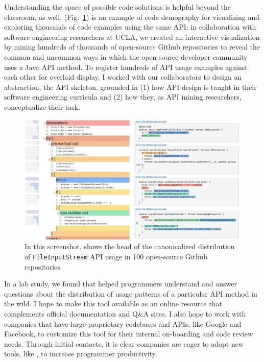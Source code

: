 \documentclass[justified]{tufte-handout}
\begin{document}
Understanding the space of possible code solutions is helpful beyond the classroom, as well. 
 (Fig.~\ref{fig:examplore}) is an example of code demography for visualizing and exploring thousands of code examples using the same API: in collaboration with software engineering researchers at UCLA, we created an interactive visualization by mining hundreds of thousands of open-source Github repositories to reveal the common and uncommon ways in which the open-source developer community uses a Java API method.\cite{examplore} To register hundreds of API usage examples against each other for overlaid display, I worked with our collaborators to design an abstraction, the API skeleton, grounded in (1) how API design is taught in their software engineering curricula and (2) how they, as API mining researchers, conceptualize their task. %
\begin{figure}[h]
  \includegraphics[width=0.65\linewidth]{Statistical_Code_Examples.png}%
  \caption{In this screenshot,  shows the head of the canonicalized distribution of \texttt{FileInputStream} API usage in 100 open-source Github repositories.}%
  \label{fig:examplore}%
\end{figure}

In a lab study, we found that  helped programmers understand and answer questions about the distribution of usage patterns of a particular API method in the wild. I hope to make this tool available as an online resource that complements official documentation and Q\&A sites. I also hope to work with companies that have large proprietary codebases and APIs, like Google and Facebook, to customize this tool for their internal on-boarding and code review needs. Through initial contacts, it is clear companies are eager to adopt new tools, like , to increase programmer productivity. 
\end{document}
